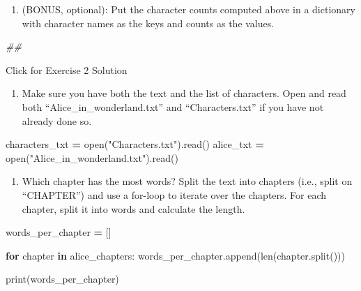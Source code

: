 \documentclass[]{book}
\newenvironment{Shaded}{\begin{snugshade}}{\end{snugshade}}
\newcommand{\BuiltInTok}[1]{#1}
\newcommand{\CommentTok}[1]{\textcolor[rgb]{0.56,0.35,0.01}{\textit{#1}}}
\newcommand{\ControlFlowTok}[1]{\textcolor[rgb]{0.13,0.29,0.53}{\textbf{#1}}}
\newcommand{\KeywordTok}[1]{\textcolor[rgb]{0.13,0.29,0.53}{\textbf{#1}}}
\newcommand{\NormalTok}[1]{#1}
\newcommand{\OperatorTok}[1]{\textcolor[rgb]{0.81,0.36,0.00}{\textbf{#1}}}
\newcommand{\StringTok}[1]{\textcolor[rgb]{0.31,0.60,0.02}{#1}}
\providecommand{\tightlist}{%
  \setlength{\itemsep}{0pt}\setlength{\parskip}{0pt}}
\begin{document}
\begin{enumerate}
\def\labelenumi{\arabic{enumi}.}
\setcounter{enumi}{3}
\tightlist
\item
  (BONUS, optional): Put the character counts computed
  above in a dictionary with character names as the keys and
  counts as the values.
\end{enumerate}

\begin{Shaded}
\begin{Highlighting}[]
\CommentTok{##}
\end{Highlighting}
\end{Shaded}

{Click for Exercise 2 Solution}

\begin{enumerate}
\def\labelenumi{\arabic{enumi}.}
\tightlist
\item
  Make sure you have both the text and the list of characters.
  Open and read both ``Alice\_in\_wonderland.txt'' and ``Characters.txt'' if you have not already done so.
\end{enumerate}

\begin{Shaded}
\begin{Highlighting}[]
\NormalTok{characters_txt }\OperatorTok{=} \BuiltInTok{open}\NormalTok{(}\StringTok{"Characters.txt"}\NormalTok{).read()}
\NormalTok{alice_txt }\OperatorTok{=} \BuiltInTok{open}\NormalTok{(}\StringTok{"Alice_in_wonderland.txt"}\NormalTok{).read()}
\end{Highlighting}
\end{Shaded}

\begin{enumerate}
\def\labelenumi{\arabic{enumi}.}
\setcounter{enumi}{1}
\tightlist
\item
  Which chapter has the most words?
  Split the text into chapters (i.e., split on ``CHAPTER'') and use a for-loop to iterate over the chapters.
  For each chapter, split it into words and calculate the length.
\end{enumerate}

\begin{Shaded}
\begin{Highlighting}[]
\NormalTok{words_per_chapter }\OperatorTok{=}\NormalTok{ []}

\ControlFlowTok{for}\NormalTok{ chapter }\KeywordTok{in}\NormalTok{ alice_chapters:}
\NormalTok{    words_per_chapter.append(}\BuiltInTok{len}\NormalTok{(chapter.split()))}

\BuiltInTok{print}\NormalTok{(words_per_chapter)}
\end{Highlighting}
\end{Shaded}
\end{document}
